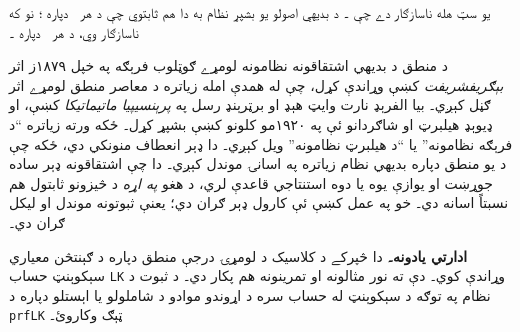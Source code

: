 \documentclass[12pt,a4paper,oneside]{report}
\newcommand{\olfileid}[3]{\gdef\pspart{#1}\gdef\pschapter{#2}\gdef\pssection{#3}}
\gdef\pspart{#2}\gdef\pschapter{#3}\gdef\pssection{}%
\theoremstyle{definition}
\newenvironment{editorial}{\begin{framed}\textbf{ادارتي يادونه۔}\enspace}{\end{framed}}
\begin{document}
\label{olpseg:OLP-0068-B009:start}
يو سټ \LR{$\Gamma$} هله ناسازګار دے چې \LR{$\Gamma \Proves \lfalse$}۔ د
بديهي اصولو يو بشپړ نظام به دا هم ثابتوي چې د هر~ دپاره
؛ نو که \LR{$\Gamma$} ناسازګار وي، د هر~ دپاره
۔
\label{olpseg:OLP-0068-B009:end}

\label{olpseg:OLP-0068-B010:start}
د منطق د بديهي اشتقاقونه نظامونه لومړے ګوټلوب فرېګه په خپل
۱۸۷۹ز اثر \emph{بېګريفشريفت} کښې وړاندې کړل، چې له همدې امله زياتره
د معاصر منطق لومړے اثر ګڼل کېږي۔ بيا الفرېډ نارت وايټ هېډ او برټرېنډ
رسل په \emph{پرېنسيپيا ماتيماتيکا} کښې، او ډيوېډ هيلبرټ او شاګردانو
ئې په ۱۹۲۰مو کلونو کښې بشپړ کړل۔ ځکه ورته زياتره ``د فرېګه نظامونه''
يا ``د هيلبرټ نظامونه'' ويل کېږي۔ دا ډېر انعطاف منونکي دي، ځکه چې د
يو منطق دپاره بديهي نظام زياتره په اسانۍ موندل کېږي۔ دا چې
اشتقاقونه ډېر ساده جوړښت او يوازې يوه يا دوه استنتاجي قاعدې
لري، د هغو \emph{په اړه} د څيزونو ثابتول هم نسبتاً اسانه دي۔ خو په
عمل کښې ئې کارول ډېر ګران دي؛ يعنې ثبوتونه موندل او ليکل ګران دي۔
\label{olpseg:OLP-0068-B010:end}

\label{olpseg:OLP-0069-B004:start}
\label{olpseg:OLP-0069-B004:end}

\label{olpseg:OLP-0069-B005:start}
\begin{editorial}
  دا څپرکے د کلاسیک د لومړۍ درجې منطق دپاره د ګېنتڅن معياري
  سېکوېنټ حساب \texttt{LK} وړاندې کوي۔ دې ته نور مثالونه او تمرينونه
  هم پکار دي۔ د ثبوت د نظام په توګه د سېکوېنټ له حساب سره د اړوندو
  موادو د شاملولو يا اېستلو دپاره د \texttt{prfLK} ټېګ وکاروئ۔
\end{editorial}
\label{olpseg:OLP-0069-B005:end}

\label{olpseg:OLP-0069-B008:start}
%


\label{olpseg:OLP-0069-B008:end}

\label{olpseg:OLP-0069-B012:start}
%


\label{olpseg:OLP-0069-B012:end}

\label{olpseg:OLP-0069-B016:start}
%


\label{olpseg:OLP-0069-B016:end}

\label{olpseg:OLP-0069-B018:start}
%



\label{olpseg:OLP-0069-B018:end}

\label{olpseg:OLP-0070-B004:start}
\olfileid{fol}{seq}{rul}
\label{olpseg:OLP-0070-B004:end}
\end{document}
